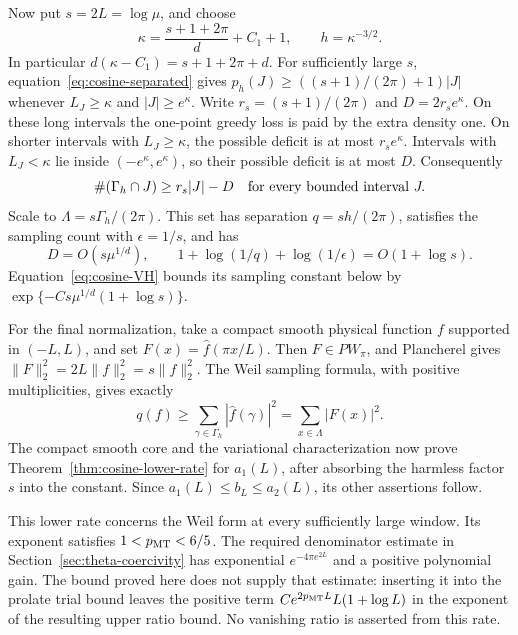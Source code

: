 Now put \(s=2L=\log\mu\), and choose
\[
 \kappa=\frac{s+1+2\pi}{d}+C_1+1,
 \qquad h=\kappa^{-3/2}.
\]
In particular \(d(\kappa-C_1)=s+1+2\pi+d\).
For sufficiently large \(s\), equation~\eqref{eq:cosine-separated}
gives
\(p_h(J)\ge((s+1)/(2\pi)+1)|J|\) whenever
\(L_J\ge\kappa\) and \(|J|\ge e^\kappa\).
Write \(r_s=(s+1)/(2\pi)\) and \(D=2r_s e^\kappa\).
On these long intervals the one-point greedy loss is paid by the
extra density one. On shorter intervals with \(L_J\ge\kappa\),
the possible deficit is at most \(r_s e^\kappa\). Intervals
with \(L_J<\kappa\) lie inside \((-e^\kappa,e^\kappa)\),
so their possible deficit is at most \(D\). Consequently
\[
 \#(\Gamma_h\cap J)\ge r_s|J|-D
                      \quad\hbox{for every bounded interval }J.
\]
Scale to \(\Lambda=s\Gamma_h/(2\pi)\). This set has separation
\(q=sh/(2\pi)\), satisfies the sampling count with
\(\epsilon=1/s\), and has
\[
 D=O(s\mu^{1/d}),\qquad
 1+\log(1/q)+\log(1/\epsilon)=O(1+\log s).
\]
Equation~\eqref{eq:cosine-VH} bounds its sampling constant below by
\(\exp\{-Cs\mu^{1/d}(1+\log s)\}\).

For the final normalization, take a compact smooth physical function
\(f\) supported in \((-L,L)\), and set
\(F(x)=\widehat f(\pi x/L)\). Then \(F\in PW_\pi\), and
Plancherel gives \(\|F\|_2^2=2L\|f\|_2^2=s\|f\|_2^2\).
The Weil sampling formula, with positive multiplicities,
gives exactly
\[
 q(f)\ge\sum_{\gamma\in\Gamma_h}|\widehat f(\gamma)|^2
       =\sum_{x\in\Lambda}|F(x)|^2.
\]
The compact smooth core and the variational characterization now
prove Theorem~\ref{thm:cosine-lower-rate} for \(a_1(L)\), after
absorbing the harmless factor \(s\) into the constant.
Since \(a_1(L)\le b_L\le a_2(L)\), its other assertions follow.

This lower rate concerns the Weil form at every
sufficiently large window. Its exponent satisfies
\(1<p_{\rm MT}<6/5\). The required denominator estimate in
Section~\ref{sec:theta-coercivity} has exponential
\(e^{-4\pi e^{2L}}\) and a positive polynomial gain. The bound
proved here does not supply that estimate: inserting it into the
prolate trial bound leaves the positive term
\(C e^{2p_{\rm MT}L}L(1+\log L)\) in the exponent of the resulting
upper ratio bound. No vanishing ratio is asserted from this rate.
